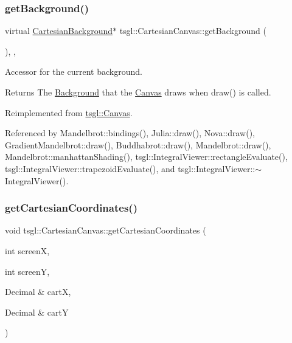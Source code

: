 \subsubsection{\texorpdfstring{get\+Background()}{getBackground()}}
{\footnotesize\ttfamily virtual \hyperlink{classtsgl_1_1_cartesian_background}{Cartesian\+Background}$\ast$ tsgl\+::\+Cartesian\+Canvas\+::get\+Background (\begin{DoxyParamCaption}{ }\end{DoxyParamCaption})\hspace{0.3cm}{\ttfamily [inline]}, {\ttfamily [override]}, {\ttfamily [virtual]}}



Accessor for the current background. 

\begin{DoxyReturn}{Returns}
The \hyperlink{classtsgl_1_1_background}{Background} that the \hyperlink{classtsgl_1_1_canvas}{Canvas} draws when draw() is called. 
\end{DoxyReturn}


Reimplemented from \hyperlink{classtsgl_1_1_canvas_a905c38881402fe1d53cab427b93aab2f}{tsgl\+::\+Canvas}.



Referenced by Mandelbrot\+::bindings(), Julia\+::draw(), Nova\+::draw(), Gradient\+Mandelbrot\+::draw(), Buddhabrot\+::draw(), Mandelbrot\+::draw(), Mandelbrot\+::manhattan\+Shading(), tsgl\+::\+Integral\+Viewer\+::rectangle\+Evaluate(), tsgl\+::\+Integral\+Viewer\+::trapezoid\+Evaluate(), and tsgl\+::\+Integral\+Viewer\+::$\sim$\+Integral\+Viewer().

\mbox{\label{classtsgl_1_1_cartesian_canvas_a736935074bb6d90bcc0c7af2edd8a4aa}} 
\subsubsection{\texorpdfstring{get\+Cartesian\+Coordinates()}{getCartesianCoordinates()}}
{\footnotesize\ttfamily void tsgl\+::\+Cartesian\+Canvas\+::get\+Cartesian\+Coordinates (\begin{DoxyParamCaption}\item[{int}]{screenX,  }\item[{int}]{screenY,  }\item[{Decimal \&}]{cartX,  }\item[{Decimal \&}]{cartY }\end{DoxyParamCaption})}



